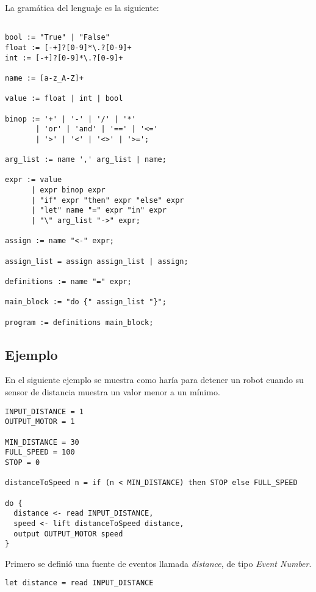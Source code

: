 La gramática del lenguaje es la siguiente:

\begin{verbatim}

bool := "True" | "False"
float := [-+]?[0-9]*\.?[0-9]+
int := [-+]?[0-9]*\.?[0-9]+

name := [a-z_A-Z]+

value := float | int | bool

binop := '+' | '-' | '/' | '*'
       | 'or' | 'and' | '==' | '<='
       | '>' | '<' | '<>' | '>=';

arg_list := name ',' arg_list | name;

expr := value
      | expr binop expr
      | "if" expr "then" expr "else" expr
      | "let" name "=" expr "in" expr
      | "\" arg_list "->" expr;

assign := name "<-" expr;

assign_list = assign assign_list | assign;

definitions := name "=" expr;

main_block := "do {" assign_list "}";

program := definitions main_block;

\end{verbatim}


\subsection{Ejemplo}

En el siguiente ejemplo se muestra como haría para detener un
robot cuando su sensor de distancia muestra un valor menor a un mínimo.

\begin{verbatim}
INPUT_DISTANCE = 1
OUTPUT_MOTOR = 1

MIN_DISTANCE = 30
FULL_SPEED = 100
STOP = 0

distanceToSpeed n = if (n < MIN_DISTANCE) then STOP else FULL_SPEED

do { 
  distance <- read INPUT_DISTANCE,
  speed <- lift distanceToSpeed distance,
  output OUTPUT_MOTOR speed
}

\end{verbatim}

Primero se definió una fuente de eventos llamada \emph{distance},
de tipo \emph{Event Number}.

\begin{verbatim}
let distance = read INPUT_DISTANCE
\end{verbatim}

